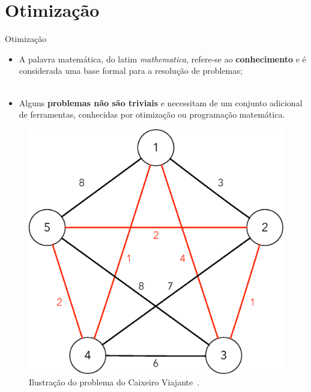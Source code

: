\section{Otimização}
\label{s.optimization}

\begin{frame}{Otimização}
	\begin{itemize}
		\justifying
		\item A palavra matemática, do latim \emph{mathematica}, refere-se ao \textbf{conhecimento} e é considerada uma base formal para a resolução de problemas;
		\\~\\
		\item Alguns \textbf{problemas não são triviais} e necessitam de um conjunto adicional de ferramentas, conhecidas por otimização ou programação matemática.
		\end{itemize}
\end{frame}

\begin{frame}
	\begin{figure}
		\centering
		\includegraphics[scale=0.4]{figs/traveling_salesman.eps}	
		\caption{Ilustração do problema do Caixeiro Viajante~\cite{Papadimitriou:77}.}
		\label{f.traveling_salesman}
	\end{figure}
\end{frame}

